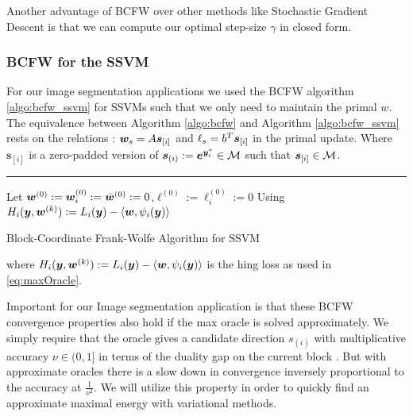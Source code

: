 Another advantage of BCFW over other methods like Stochastic Gradient Descent is that we can compute our optimal step-size $\gamma$ in closed form. 

\subsubsection{BCFW for the SSVM}
For our image segmentation applications we used the BCFW algorithm \ref{algo:bcfw_ssvm} for SSVMs such that we only need to maintain the primal $w$. The equivalence between Algorithm \ref{algo:bcfw} and Algorithm \ref{algo:bcfw_ssvm} rests on the  relations : $\bm{w}_s = A\bm{s}_{[i]}$ and $\ell_s = b^T\bm{s}_{[i]}$ in the primal update. Where $\bm{s}_{[i]}$ is a zero-padded version of $\bm{s}_{(i)} := \bm{e}^{\bm{y}_i^*} \in \mathcal{M}$ such that $\bm{s}_{[i]} \in \mathcal{M}$. 

\begin{samepage}
  \rule{\textwidth}{2pt}
  \begin{algorithm}[H]\label{algo:bcfw_ssvm}
   Let $\bm{w}^{(0)}:=\bm{w}^{(0)}_i := \bar{\bm{w}}^{(0)} := 0$,\quad $\ell^{(0)} := \ell_i^{(0)} := 0$\;
   Using $H_i(\bm{y},\bm{w}^{(k)}) := L_i(\bm{y})-\langle \bm{w}, \psi_i(\bm{y}) \rangle$ \;

   \caption{ Block-Coordinate Frank-Wolfe Algorithm for SSVM}
  \end{algorithm}
  \hrulefill
\end{samepage}


where $H_i(\bm{y},\bm{w}^{(k)}) := L_i(\bm{y})-\langle \bm{w}, \psi_i(\bm{y}) \rangle$ is the hing loss as used in  \ref{eq:maxOracle}. 

Important for our Image segmentation application is that these BCFW convergence properties also hold if the max oracle is solved approximately. We simply require that the oracle gives a candidate direction $s_{(i)}$ with multiplicative accuracy $\nu \in (0,1]$ in terms of the duality gap on the current block \cite{lacoste2012block}. But with approximate oracles there is a slow down in convergence inversely proportional to the accuracy at $\frac{1}{\nu^2}$. We will utilize this property in order to quickly find an approximate maximal energy with variational methods. 


